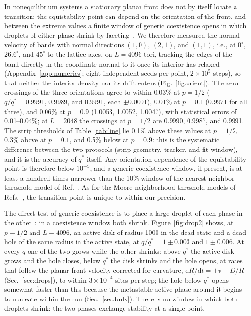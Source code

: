 \documentclass[pre,twocolumn,superscriptaddress,showpacs,floatfix]{revtex4-2}
\newcommand{\qs}{q^{*}}
\newcommand{\ds}{\mathrm{d}}
\begin{document}
In nonequilibrium systems a stationary planar front does not by itself locate a transition: the
equistability point can depend on the orientation of the front, and between the extreme values a
finite window of generic coexistence opens in which droplets of either phase shrink by
faceting~\cite{toom1980,bennett1985,wang2015}. We therefore measured the normal velocity of bands
with normal directions $(1,0)$, $(2,1)$, and $(1,1)$, i.e., at $0^\circ$, $26.6^\circ$, and $45^\circ$
to the lattice axes, on $L = 4096$ tori, tracking the edges of the band directly in the coordinate
normal to it once its interior has relaxed (Appendix~\ref{app:numerics}; eight independent seeds
per point, $2\times10^5$ steps), so that neither the interior density nor its drift enters
(Fig.~\ref{fig:orient}). The zero crossings of the three orientations agree to within 0.03\% at
$p = 1/2$ ($q/\qs = 0.9991$, 0.9989, and 0.9991, each $\pm0.0001$), 0.01\% at $p = 0.1$ (0.9971 for
all three), and 0.06\% at $p = 0.9$ (1.0053, 1.0052, 1.0047), with statistical errors of
0.01--0.04\%; at $L = 2048$ the crossings at $p = 1/2$ are 0.9990, 0.9987, and 0.9991. The strip
thresholds of Table~\ref{tab:line} lie 0.1\% above these values at $p = 1/2$, 0.3\% above at
$p = 0.1$, and 0.5\% below at $p = 0.9$: this is the systematic difference between the two
protocols (strip geometry, tracker, and fit window), and it is the accuracy of $\qs$ itself. Any
orientation dependence of the equistability point is therefore below $10^{-3}$, and a
generic-coexistence window, if present, is at least a hundred times narrower than the 10\% window
of the nearest-neighbor threshold model of Ref.~\cite{wang2015}. As for the Moore-neighborhood
threshold models of Refs.~\cite{liu2018,liu2025}, the transition point is unique to within our
precision.

The direct test of generic coexistence is to place a large droplet of each phase in the
other~\cite{wang2015}: in a coexistence window both shrink. Figure~\ref{fig:drop2} shows, at
$p = 1/2$ and $L = 4096$, an active disk of radius 1000 in the dead state and a dead hole of the same
radius in the active state, at $q/\qs = 1\pm0.003$ and $1\pm0.006$. At every $q$ one of the two grows
while the other shrinks: above $\qs$ the active disk grows and the hole closes, below $\qs$ the
disk shrinks and the hole opens, at rates that follow the planar-front velocity corrected for
curvature, $\ds R/\ds t = \pm v - D/R$ (Sec.~\ref{sec:drops}), to within $3\times10^{-4}$ sites per
step; the hole below $\qs$ opens somewhat faster than this because the metastable active phase
around it begins to nucleate within the run (Sec.~\ref{sec:bulk}). There is no window in which
both droplets shrink: the two phases exchange stability at a single point.
\end{document}
